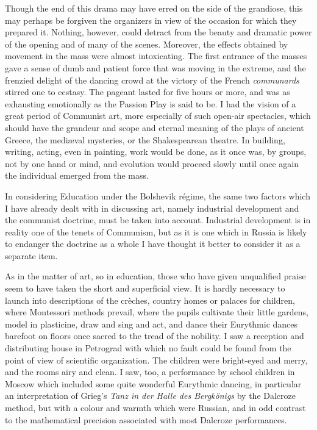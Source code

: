 Though the end of this drama may have erred on the side of the grandiose, this may perhaps be forgiven the organizers in view of the occasion for which they prepared it. Nothing, however, could detract from the beauty and dramatic power of the opening and of many of the scenes. Moreover, the effects obtained by movement in the mass were almost intoxicating. The first entrance of the masses gave a sense of dumb and patient force that was moving in the extreme, and the frenzied delight of the dancing crowd at the victory of the French \emph{communards} stirred one to ecstasy. The pageant lasted for five hours or more, and was as exhausting emotionally as the Passion Play is said to be. I had the vision of a great period of Communist art, more especially of such open-air spectacles, which should have the grandeur and scope and eternal meaning of the plays of ancient Greece, the mediæval mysteries, or the Shakespearean theatre. In building, writing, acting, even in painting, work would be done, as it once was, by groups, not by one hand or mind, and evolution would proceed slowly until once again the individual emerged from the mass.

In considering Education under the Bolshevik régime, the same two factors which I have already dealt with in discussing art, namely industrial development and the communist doctrine, must be taken into account. Industrial development is in reality one of the tenets of Communism, but as it is one which in Russia is likely to endanger the doctrine as a whole I have thought it better to consider it as a separate item.

As in the matter of art, so in education, those who have given unqualified praise seem to have taken the short and superficial view. It is hardly necessary to launch into descriptions of the crèches, country homes or palaces for children, where Montessori methods prevail, where the pupils cultivate their little gardens, model in plasticine, draw and sing and act, and dance their Eurythmic dances barefoot on floors once sacred to the tread of the nobility. I saw a reception and distributing house in Petrograd with which no fault could be found from the point of view of scientific organization. The children were bright-eyed and merry, and the rooms airy and clean. I saw, too, a performance by school children in Moscow which included some quite wonderful Eurythmic dancing, in particular an interpretation of Grieg's \emph{Tanz in der Halle des Bergkönigs} by the Dalcroze method, but with a colour and warmth which were Russian, and in odd contrast to the mathematical precision associated with most Dalcroze performances.

